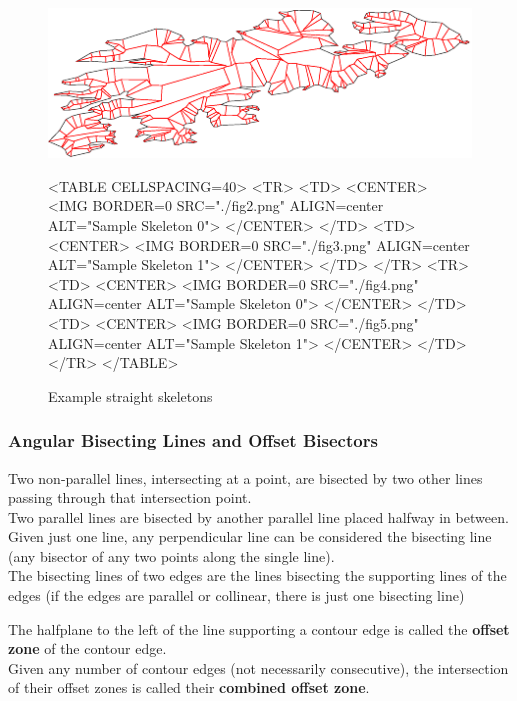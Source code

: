 \begin{figure}[htbp]
\begin{ccTexOnly}
\begin{center}
\includegraphics{Straight_skeleton_2/fig5} %
\end{center}
\end{ccTexOnly}
\caption{Example straight skeletons
\label{SampleSLS}}
\begin{ccHtmlOnly}
<TABLE CELLSPACING=40>
<TR>
<TD>
<CENTER>
<IMG BORDER=0 SRC="./fig2.png" ALIGN=center ALT="Sample Skeleton 0">
</CENTER>
</TD>
<TD>
<CENTER>
<IMG BORDER=0 SRC="./fig3.png" ALIGN=center ALT="Sample Skeleton 1">
</CENTER>
</TD>
</TR>
<TR>
<TD>
<CENTER>
<IMG BORDER=0 SRC="./fig4.png" ALIGN=center ALT="Sample Skeleton 0">
</CENTER>
</TD>
<TD>
<CENTER>
<IMG BORDER=0 SRC="./fig5.png" ALIGN=center ALT="Sample Skeleton 1">
</CENTER>
</TD>
</TR>
</TABLE>
\end{ccHtmlOnly}
\end{figure}
  
\subsubsection{Angular Bisecting Lines and Offset Bisectors}  

Two non-parallel lines, intersecting at a point, are bisected by two other lines passing through that intersection point.\\
Two parallel lines are bisected by another parallel line placed halfway in between.\\
Given just one line, any perpendicular line can be considered the bisecting line (any bisector of any two points along the single line).\\
The bisecting lines of two edges are the lines bisecting the supporting lines of the edges (if the edges are parallel or collinear, there is just one bisecting line)

The halfplane to the left of the line supporting a contour edge is called the \textbf{offset zone} of the contour edge.\\
Given any number of contour edges (not necessarily consecutive), the intersection of their offset zones is called their \textbf{combined offset zone}.

